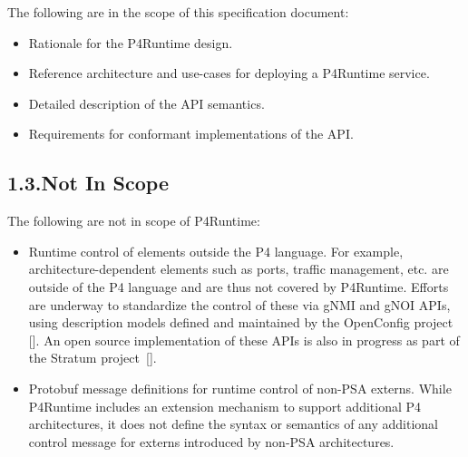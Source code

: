 \documentclass[11pt]{article}
\begin{document}
{%
\noindent{}The following are in the scope of this specification document:%

\begin{itemize}[noitemsep,topsep=\mdcompacttopsep]%

\item{}Rationale for the P4Runtime design.%

\item{}Reference architecture and use-cases for deploying a P4Runtime service.%

\item{}Detailed description of the API semantics.%

\item{}Requirements for conformant implementations of the API.%
\end{itemize}%

\subsection{1.3.\hspace*{0.5em}Not In Scope}\label{sec-not-in-scope}%

\noindent{}The following are not in scope of P4Runtime:%

\begin{itemize}[noitemsep,topsep=\mdcompacttopsep]%

\item{}Runtime control of elements outside the P4 language. For example,
architecture-dependent elements such as ports, traffic management, etc. are
outside of the P4 language and are thus not covered by P4Runtime. Efforts are
underway to standardize the control of these via gNMI and gNOI APIs, using
description models defined and maintained by the OpenConfig project
[]. An open source implementation of these APIs is also in progress
as part of the Stratum project~[].%

\item{}Protobuf message definitions for runtime control of non-PSA externs. While
P4Runtime includes an extension mechanism to support additional P4
architectures, it does not define the syntax or semantics of any additional
control message for externs introduced by non-PSA architectures.%
\end{itemize}%

}
\end{document}
